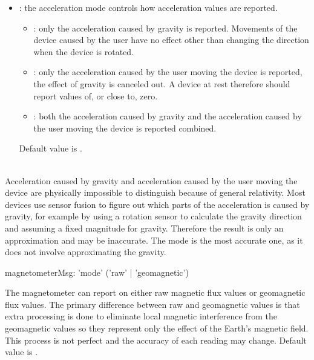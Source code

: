 \begin{itemize}
\item {}: the acceleration mode controls how acceleration values are reported. 
\begin{itemize}
\item {}: only the acceleration caused by gravity is reported. Movements of the device caused by the user have no effect other than changing the direction when the device is rotated. 
\item {}: only the acceleration caused by the user moving the device is reported, the effect of gravity is canceled out. A device at rest therefore should report values of, or close to, zero. 
\item {}: both the acceleration caused by gravity and the acceleration caused by the user moving the device is reported combined. 
\end{itemize}
Default value is .
\end{itemize}

\\
Acceleration caused by gravity and acceleration caused by the user moving the device are physically impossible to distinguish because of general relativity. Most devices use sensor fusion to figure out which parts of the acceleration is caused by gravity, for example by using a rotation sensor to calculate the gravity direction and assuming a fixed magnitude for gravity. Therefore the result is only an approximation and may be inaccurate. The  mode is the most accurate one, as it does not involve approximating the gravity.



\begin{rail}
magnetometerMsg: 	'mode' ('raw' | 'geomagnetic')
\end{rail}

The magnetometer can report on either raw magnetic flux values or geomagnetic flux values. 
The primary difference between raw and geomagnetic values is that extra processing is done to eliminate local magnetic interference from the geomagnetic values so they represent only the effect of the Earth's magnetic field. This process is not perfect and the accuracy of each reading may change.
Default value is .


\label{rotmsg}

